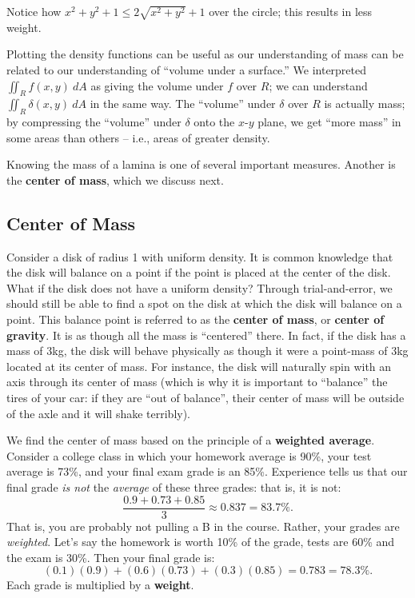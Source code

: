 {Notice how $x^2+y^2+1 \leq 2\sqrt{x^2+y^2}+1$ over the circle; this results in less weight.}

Plotting the density functions can be useful as our understanding of mass can be related to our understanding of ``volume under a surface.'' We interpreted $\iint_R f(x,y)\ dA$ as giving the volume under $f$ over $R$; we can understand $\iint_R\delta(x,y)\ dA$ in the same way. The ``volume'' under $\delta$ over $R$ is actually mass; by compressing the ``volume'' under $\delta$ onto the $x$-$y$ plane, we get ``more mass'' in some areas than others -- i.e., areas of greater density.

Knowing the mass of a lamina is one of several important measures. Another is the \textbf{center of mass}, which we discuss next.

\subsection{Center of Mass}

Consider a disk of radius 1 with uniform density. It is common knowledge that the disk will balance on a point if the point is placed at the center of the disk. What if the disk does not have a uniform density? Through trial-and-error, we should still be able to find a spot on the disk at which the disk will balance on a point. This balance point is referred to as the \textbf{center of mass}, or \textbf{center of gravity}. It is as though all the mass is ``centered'' there. In fact, if the disk has a mass of 3kg, the disk will behave physically as though it were a point-mass of 3kg located at its center of mass. For instance, the disk will naturally spin with an axis through its center of mass (which is why it is important to ``balance'' the tires of your car: if they are ``out of balance'', their center of mass will be outside of the axle and it will shake terribly).

We find the center of mass based on the principle of a \textbf{weighted average}. Consider a college class in which your homework average is 90\%, your test average is 73\%, and your final exam grade is an 85\%. Experience tells us that our final grade \textit{is not} the \textit{average} of these three grades: that is, it is not:
\[\frac{0.9+0.73+0.85}{3} \approx 0.837 = 83.7\text{\%}.\]
That is, you are probably not pulling a B in the course. Rather, your grades are \textit{weighted}. Let's say the homework is worth 10\% of the grade, tests are 60\% and the exam is 30\%. Then your final grade is:
\[(0.1)(0.9) + (0.6)(0.73)+(0.3)(0.85) = 0.783 = 78.3\text{\%}.\]
Each grade is multiplied by a \textbf{weight}. 

